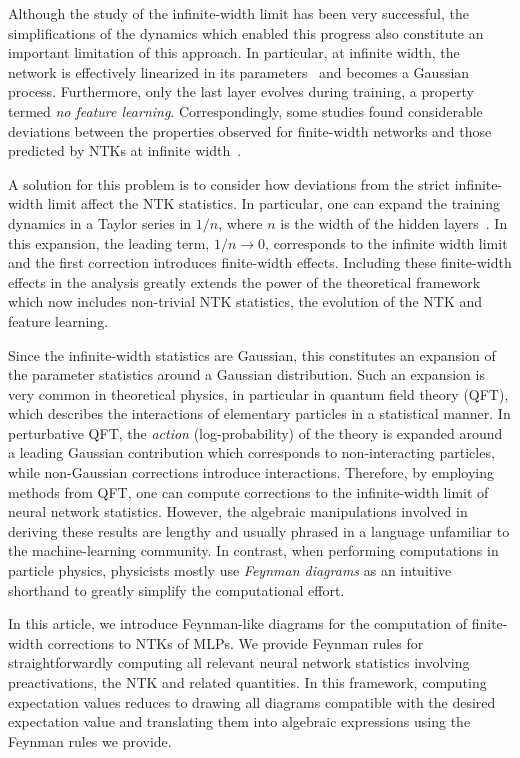 Although the study of the infinite-width limit has been very successful, the simplifications of the dynamics which enabled this progress also constitute an important limitation of this approach. In particular, at infinite width, the network is effectively linearized in its parameters~\cite{lee2019a} and becomes a Gaussian process. Furthermore, only the last layer evolves during training, a property termed \emph{no feature learning}. Correspondingly, some studies found considerable deviations between the properties observed for finite-width networks and those predicted by NTKs at infinite width~\cite{NEURIPS2020_ad086f59, wenger2024, liu2025}.

A solution for this problem is to consider how deviations from the strict infinite-width limit affect the NTK statistics. In particular, one can expand the training dynamics in a Taylor series in $1/n$, where $n$ is the width of the hidden layers~\cite{yaida2020, roberts2022}. In this expansion, the leading term, $1/n\rightarrow0$, corresponds to the infinite width limit and the first correction introduces finite-width effects. Including these finite-width effects in the analysis greatly extends the power of the theoretical framework which now includes non-trivial NTK statistics, the evolution of the NTK and feature learning.

Since the infinite-width statistics are Gaussian, this constitutes an expansion of the parameter statistics around a Gaussian distribution. Such an expansion is very common in theoretical physics, in particular in quantum field theory (QFT), which describes the interactions of elementary particles in a statistical manner. In perturbative QFT, the \emph{action} (log-probability) of the theory is expanded around a leading Gaussian contribution which corresponds to non-interacting particles, while non-Gaussian corrections introduce interactions. Therefore, by employing methods from QFT, one can compute corrections to the infinite-width limit of neural network statistics. However, the algebraic manipulations involved in deriving these results are lengthy and usually phrased in a language unfamiliar to the machine-learning community. In contrast, when performing computations in particle physics, physicists mostly use \emph{Feynman diagrams} as an intuitive shorthand to greatly simplify the computational effort.

In this article, we introduce Feynman-like diagrams for the computation of finite-width corrections to NTKs of MLPs. We provide Feynman rules for straightforwardly computing all relevant neural network statistics involving preactivations, the NTK and related quantities. In this framework, computing expectation values reduces to drawing all diagrams compatible with the desired expectation value and translating them into algebraic expressions using the Feynman rules we provide.

